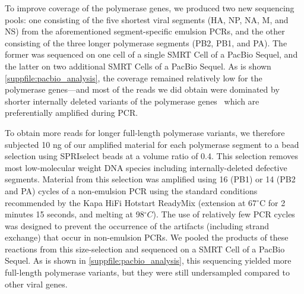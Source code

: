 \documentclass[lineno]{asm-article}
\newcommand{\SUPPFILE}[1]{\autoref{suppfile:#1}}
\begin{document}
To improve coverage of the polymerase genes, we produced two new sequencing pools: one consisting of the five shortest viral segments (HA, NP, NA, M, and NS) from the aforementioned segment-specific emulsion PCRs, and the other consisting of the three longer polymerase segments (PB2, PB1, and PA).
The former was sequenced on one cell of a single SMRT Cell of a PacBio Sequel, and the latter on two additional SMRT Cells of a PacBio Sequel. 
As is shown \SUPPFILE{pacbio_analysis}, the coverage remained relatively low for the polymerase genes---and most of the reads we did obtain were dominated by shorter internally deleted variants of the polymerase genes~\cite{xue2016propagation} which are preferentially amplified during PCR.

To obtain more reads for longer full-length polymerase variants, we therefore subjected 10 ng of our amplified material for each polymerase segment to a bead selection using SPRIselect beads at a volume ratio of 0.4. 
This selection removes most low-molecular weight DNA species including internally-deleted defective segments.
Material from this selection was amplified using 16 (PB1) or 14 (PB2 and PA) cycles of a non-emulsion PCR using the standard conditions recommended by the Kapa HiFi Hotstart ReadyMix (extension at 67$^{\circ}$C for 2 minutes 15 seconds, and melting at 98$^{\circ}C$).
The use of relatively few PCR cycles was designed to prevent the occurrence of the artifacts (including strand exchange) that occur in non-emulsion PCRs.
We pooled the products of these reactions from this size-selection and sequenced on a SMRT Cell of a PacBio Sequel.
As is shown in \SUPPFILE{pacbio_analysis}, this sequencing yielded more full-length polymerase variants, but they were still undersampled compared to other viral genes.
\end{document}
